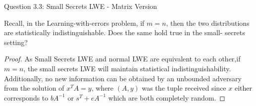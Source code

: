 \begin{solution}{Question 3.3: Small Secrets LWE - Matrix Version}\label{ques:33}
    \begin{question}
    Recall, in the Learning-with-errors problem, if $m = n$, then the two distributions are statistically indistinguishable. Does the same hold true in the small- secrets setting?
    \end{question}
    \tcblower{}
    \begin{proof}
        As Small Secrets LWE and normal LWE are equivalent to each other,if $m=n$, the small secrets LWE will maintain statistical indistinguishability. Additionally, no new information can be obtained by an unbounded adversary from the solution of $x^TA = y$, where $(A, y)$ was the tuple received since $x$ either corresponds to $bA^{-1}$ or $s^T+eA^{-1}$ which are both completely random.
    \end{proof}
\end{solution}
